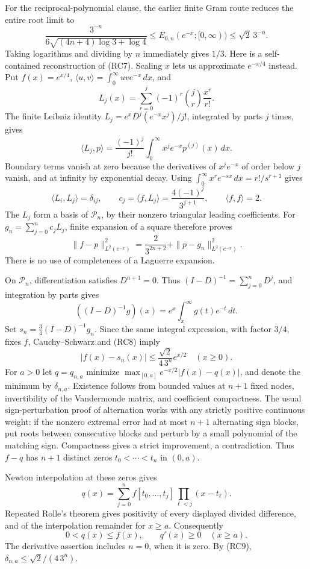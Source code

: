 \documentclass[11pt,a4paper]{article}
\theoremstyle{definition}
\begin{document}
For the reciprocal-polynomial clause, the earlier finite Gram route
reduces the entire root limit to
\[
 \frac{3^{-n}}{6\sqrt{(4n+4)\log3+\log4}}
 \le E_{0,n}(e^{-x};[0,\infty))\le\sqrt2\,3^{-n}. \tag{RC7}
\]
Taking logarithms and dividing by $n$ immediately gives $1/3$.
Here is a self-contained reconstruction of (RC7). Scaling $x$ lets
us approximate $e^{-x/4}$ instead. Put $f(x)=e^{x/4}$,
$\langle u,v\rangle=\int_0^\infty uv e^{-x}\,dx$, and
\[
 L_j(x)=\sum_{r=0}^j(-1)^r\binom jr\frac{x^r}{r!}.
\]
The finite Leibniz identity
$L_j=e^x D^j(e^{-x}x^j)/j!$, integrated by parts $j$ times, gives
\[
 \langle L_j,p\rangle=\frac{(-1)^j}{j!}
             \int_0^\infty x^je^{-x}p^{(j)}(x)\,dx.
\]
Boundary terms vanish at zero because the derivatives of $x^je^{-x}$
of order below $j$ vanish, and at infinity by exponential decay.
Using $\int_0^\infty x^re^{-s x}\,dx=r!/s^{r+1}$ gives
\[
 \langle L_i,L_j\rangle=\delta_{ij},\qquad
 c_j=\langle f,L_j\rangle=\frac{4(-1)^j}{3^{j+1}},\qquad
 \langle f,f\rangle=2.
\]
The $L_j$ form a basis of $\mathcal P_n$, by their nonzero triangular
leading coefficients. For $g_n=\sum_{j=0}^nc_jL_j$, finite expansion
of a square therefore proves
\[
 \|f-p\|_{L^2(e^{-x})}^2
 =\frac{2}{3^{2n+2}}+\|p-g_n\|_{L^2(e^{-x})}^2. \tag{RC8}
\]
There is no use of completeness of a Laguerre expansion.

On $\mathcal P_n$, differentiation satisfies $D^{n+1}=0$. Thus
$(I-D)^{-1}=\sum_{j=0}^nD^j$, and integration by parts gives
\[
 ((I-D)^{-1}g)(x)=e^x\int_x^\infty g(t)e^{-t}\,dt.
\]
Set $s_n=\tfrac34(I-D)^{-1}g_n$. Since the same integral expression,
with factor $3/4$, fixes $f$, Cauchy--Schwarz and (RC8) imply
\[
 |f(x)-s_n(x)|\le\frac{\sqrt2}{4\,3^n}e^{x/2}\quad(x\ge0).
                                                               \tag{RC9}
\]
For $a>0$ let $q=q_{n,a}$ minimize
$\max_{[0,a]}e^{-x/2}|f(x)-q(x)|$, and denote the minimum by
$\delta_{n,a}$. Existence follows from bounded values at $n+1$
fixed nodes, invertibility of the Vandermonde matrix, and coefficient
compactness. The usual sign-perturbation proof of alternation works
with any strictly positive continuous weight: if the nonzero
extremal error had at most $n+1$ alternating sign blocks, put roots
between consecutive blocks and perturb by a small polynomial of the
matching sign. Compactness gives a strict improvement, a contradiction.
Thus $f-q$ has $n+1$ distinct zeros $t_0<\cdots<t_n$ in $(0,a)$.

Newton interpolation at these zeros gives
\[
 q(x)=\sum_{j=0}^n f[t_0,\ldots,t_j]
                    \prod_{\ell<j}(x-t_\ell).
\]
Repeated Rolle's theorem gives positivity of every displayed divided
difference, and of the interpolation remainder for $x\ge a$.
Consequently
\[
 0<q(x)\le f(x),\qquad q'(x)\ge0\quad(x\ge a). \tag{RC10}
\]
The derivative assertion includes $n=0$, when it is zero. By (RC9),
$\delta_{n,a}\le\sqrt2/(4\,3^n)$.
\end{document}
